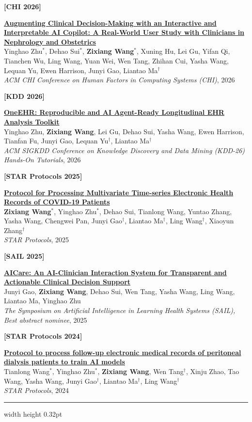 \documentclass[10pt,a4paper]{article}
\newlength{\pubcategorywidth}
\newcommand{\pubcategorytitle}[1]{%
    \par\vspace{1.2mm}%
    \settowidth{\pubcategorywidth}{{\normalsize\textbf{#1}}}%
    \noindent{\normalsize\textcolor{darkred}{\textbf{#1}}}\par
    \vspace{0.45mm}%
    {\color{darkred}\hrule width \pubcategorywidth height 0.32pt}
    \vspace{1.45mm}%
}
\newcommand{\pubentry}[5]{
    \noindent
    \begin{minipage}[t]{0.145\textwidth}
    \raggedright\small\textbf{#1}
    \end{minipage}
    \hfill
    \begin{minipage}[t]{0.84\textwidth}
    {\small\textbf{\textcolor{black}{#2}}}\\[-0.1mm]
    {\small #3}\\[-0.1mm]
    {\small\textit{#4}, #5}
    \end{minipage}
    \par\vspace{1.35mm}
}
\begin{document}
\pubentry{[CHI 2026]}
{\begingroup\hypersetup{hidelinks}\href{https://arxiv.org/abs/2602.00726}{Augmenting Clinical Decision-Making with an Interactive and Interpretable AI Copilot: A Real-World User Study with Clinicians in Nephrology and Obstetrics}\endgroup}
{Yinghao Zhu$^{\ast}$, Dehao Sui$^{\ast}$, \textbf{Zixiang Wang}$^{\ast}$, Xuning Hu, Lei Gu, Yifan Qi, Tianchen Wu, Ling Wang, Yuan Wei, Wen Tang, Zhihan Cui, Yasha Wang, Lequan Yu, Ewen Harrison, Junyi Gao, Liantao Ma$^{\dagger}$}
{ACM CHI Conference on Human Factors in Computing Systems (CHI)}
{2026}
\pubentry{[KDD 2026]}
{\begingroup\hypersetup{hidelinks}\href{https://medx-pku.github.io/OneEHR/}{OneEHR: Reproducible and AI Agent-Ready Longitudinal EHR Analysis Toolkit}\endgroup}
{Yinghao Zhu, \textbf{Zixiang Wang}, Lei Gu, Dehao Sui, Yasha Wang, Ewen Harrison, Tianfan Fu, Junyi Gao, Lequan Yu$^{\dagger}$, Liantao Ma$^{\dagger}$}
{ACM SIGKDD Conference on Knowledge Discovery and Data Mining (KDD-26) Hands-On Tutorials}
{2026}
\pubentry{[STAR Protocols 2025]}
{\begingroup\hypersetup{hidelinks}\href{https://star-protocols.cell.com/protocols/4069}{Protocol for Processing Multivariate Time-series Electronic Health Records of COVID-19 Patients}\endgroup}
{\textbf{Zixiang Wang}$^{\ast}$, Yinghao Zhu$^{\ast}$, Dehao Sui, Tianlong Wang, Yuntao Zhang, Yasha Wang, Chengwei Pan, Junyi Gao$^{\dagger}$, Liantao Ma$^{\dagger}$, Ling Wang$^{\dagger}$, Xiaoyun Zhang$^{\dagger}$}
{STAR Protocols}
{2025}
\pubentry{[SAIL 2025]}
{\begingroup\hypersetup{hidelinks}\href{https://aboutme.vixerunt.org/assets/material/sail_aicare.pdf}{AICare: An AI-Clinician Interaction System for Transparent and Actionable Clinical Decision Support}\endgroup}
{Junyi Gao, \textbf{Zixiang Wang}, Dehao Sui, Wen Tang, Yasha Wang, Ling Wang, Liantao Ma, Yinghao Zhu}
{The Symposium on Artificial Intelligence in Learning Health Systems (SAIL), Best abstract nominee}
{2025}
\pubentry{[STAR Protocols 2024]}
{\begingroup\hypersetup{hidelinks}\href{https://star-protocols.cell.com/protocols/3756}{Protocol to process follow-up electronic medical records of peritoneal dialysis patients to train AI models}\endgroup}
{Tianlong Wang$^{\ast}$, Yinghao Zhu$^{\ast}$, \textbf{Zixiang Wang}, Wen Tang$^{\dagger}$, Xinju Zhao, Tao Wang, Yasha Wang, Junyi Gao$^{\dagger}$, Liantao Ma$^{\dagger}$, Ling Wang$^{\dagger}$}
{STAR Protocols}
{2024}
\pagebreak
\pubcategorytitle{LLM for Healthcare}
\end{document}
